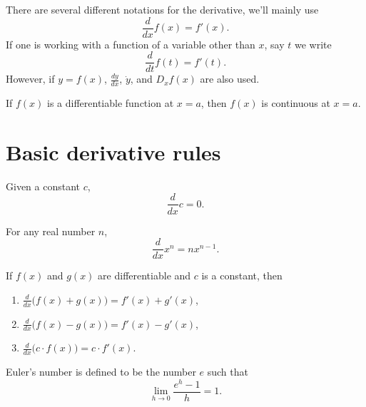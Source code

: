 \documentclass{ximera}
\newcommand{\dd}[2][]{\frac{d #1}{d #2}}
\newcommand{\ddx}{\frac{d}{dx}}
\begin{document}
\begin{definition}
There are several different notations for the derivative, we'll mainly
use
\[
\ddx f(x) = f'(x).
\]
If one is working with a function of a variable other than $x$, say $t$ we write
\[
\dd{t} f(t) = f'(t).
\]
However, if $y = f(x)$, $\dd[y]{x}$, $\dot{y}$, and $D_x f(x)$ are
also used.
\end{definition}




\begin{theorem}
If $f(x)$ is a differentiable function at $x = a$, then $f(x)$ is
continuous at $x=a$.
\end{theorem}







\section{Basic derivative rules}







\begin{theorem}
Given a constant $c$,
\[
\ddx c = 0.
\]
\end{theorem}




\begin{theorem}
For any real number $n$,
\[
\ddx x^n = n x^{n-1}.
\]
\end{theorem}




\begin{theorem}
If $f(x)$ and $g(x)$ are differentiable and $c$ is a constant, then
\begin{enumerate}
\item\label{SR:1} $\ddx \big( f(x) + g(x)\big) = f'(x) + g'(x)$,
\item $\ddx \big( f(x) - g(x)\big) = f'(x) - g'(x)$,
\item $\ddx \big(c\cdot f(x)\big) = c\cdot f'(x)$.
\end{enumerate}
\end{theorem}




\begin{definition}
Euler's number is defined to be the number $e$ such that
\[
\lim_{h\to 0} \frac{e^h-1}{h} = 1.
\]
\end{definition}
\end{document}
